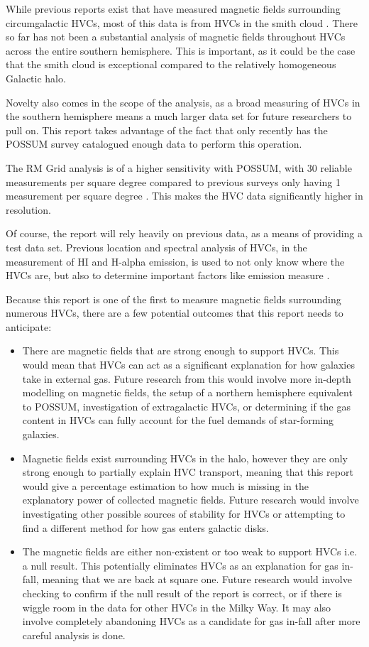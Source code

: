 While previous reports exist that have measured magnetic fields surrounding circumgalactic HVCs, most of this data is from HVCs in the smith cloud \cite{ID2, ID5, ID23, ID26}. There so far has not been a substantial analysis of magnetic fields throughout HVCs across the entire southern hemisphere. This is important, as it could be the case that the smith cloud is exceptional compared to the relatively homogeneous Galactic halo.

Novelty also comes in the scope of the analysis, as a broad measuring of HVCs in the southern hemisphere means a much larger data set for future researchers to pull on. This report takes advantage of the fact that only recently has the POSSUM survey catalogued enough data to perform this operation.

The RM Grid analysis is of a higher sensitivity with POSSUM, with 30 reliable measurements per square degree compared to previous surveys only having 1 measurement per square degree \cite{ID18, ID1}. This makes the HVC data significantly higher in resolution.

Of course, the report will rely heavily on previous data, as a means of providing a test data set. Previous location and spectral analysis of HVCs, in the measurement of HI and H-alpha emission, is used to not only know where the HVCs are, but also to determine important factors like emission measure \cite{ID5, ID26, ID30}.

Because this report is one of the first to measure magnetic fields surrounding numerous HVCs, there are a few potential outcomes that this report needs to anticipate:
\begin{itemize}
\item There are magnetic fields that are strong enough to support HVCs. This would mean that HVCs can act as a significant explanation for how galaxies take in external gas. Future research from this would involve more in-depth modelling on magnetic fields, the setup of a northern hemisphere equivalent to POSSUM, investigation of extragalactic HVCs, or determining if the gas content in HVCs can fully account for the fuel demands of star-forming galaxies.
\item Magnetic fields exist surrounding HVCs in the halo, however they are only strong enough to partially explain HVC transport, meaning that this report would give a percentage estimation to how much is missing in the explanatory power of collected magnetic fields. Future research would involve investigating other possible sources of stability for HVCs or attempting to find a different method for how gas enters galactic disks.
\item The magnetic fields are either non-existent or too weak to support HVCs i.e. a null result. This potentially eliminates HVCs as an explanation for gas in-fall, meaning that we are back at square one. Future research would involve checking to confirm if the null result of the report is correct, or if there is wiggle room in the data for other HVCs in the Milky Way. It may also involve completely abandoning HVCs as a candidate for gas in-fall after more careful analysis is done.
\end{itemize}